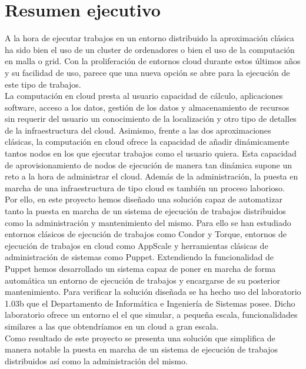 \chapter{Resumen ejecutivo}
\label{cap:resumen}

{\sf

A la hora de ejecutar trabajos en un entorno distribuido la aproximación clásica ha sido bien el uso de un cluster de ordenadores o bien el uso de la computación en malla o grid. Con la proliferación de entornos cloud durante estos últimos años y su facilidad de uso, parece que una nueva opción se abre para la ejecución de este tipo de trabajos.\\

La computación en cloud presta al usuario capacidad de cálculo, aplicaciones software, acceso a los datos, gestión de los datos y almacenamiento de recursos sin requerir del usuario un conocimiento de la localización y otro tipo de detalles de la infraestructura del cloud. Asimismo, frente a las dos aproximaciones clásicas, la computación en cloud ofrece la capacidad de añadir dinámicamente tantos nodos en los que ejecutar trabajos como el usuario quiera. Esta capacidad de aprovisionamiento de nodos de ejecución de manera tan dinámica supone un reto a la hora de administrar el cloud. Además de la administración, la puesta en marcha de una infraestructura de tipo cloud es también un proceso laborioso.\\

Por ello, en este proyecto hemos diseñado una solución capaz de automatizar tanto la puesta en marcha de un sistema de ejecución de trabajos distribuidos como la administración y mantenimiento del mismo. Para ello se han estudiado entornos clásicos de ejecución de trabajos como Condor y Torque, entornos de ejecución de trabajos en cloud como AppScale y herramientas clásicas de administración de sistemas como Puppet. Extendiendo la funcionalidad de Puppet hemos desarrollado un sistema capaz de poner en marcha de forma automática un entorno de ejecución de trabajos y encargarse de su posterior mantenimiento. Para verificar la solución diseñada se ha hecho uso del laboratorio 1.03b que el Departamento de Informática e Ingeniería de Sistemas posee. Dicho laboratorio ofrece un entorno el el que simular, a pequeña escala, funcionalidades similares a las que obtendríamos en un cloud a gran escala.\\

Como resultado de este proyecto se presenta una solución que simplifica de manera notable la puesta en marcha de un sistema de ejecución de trabajos distribuidos así como la administración del mismo.
}
